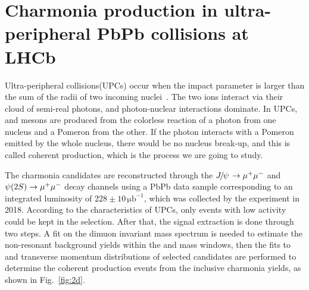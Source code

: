 \documentclass{appolb}
\begin{document}
\section{Charmonia production in ultra-peripheral PbPb collisions at LHCb~\cite{LHCb:2022ahs} }
Ultra-peripheral collisions(UPCs) occur when the impact parameter is larger than the sum of the radii of two incoming nuclei~\cite{Bertulani:2005ru}. 
The two ions interact via their cloud of semi-real photons, and photon-nuclear interactions dominate. 
In UPCs, \jpsi and \psitwos mesons are produced from the colorless reaction of a photon from one nucleus and a Pomeron from the other.
If the photon interacts with a Pomeron emitted by the whole nucleus, there would be no nucleus break-up, and this is called coherent production, which is the process we are going to study.

The charmonia candidates are reconstructed through the ${{J\mskip -3mu/\mskip -2mu\psi\mskip 2mu}}\rightarrow{\ensuremath{\mu^+\mu^-}}$ and ${\psi{(2S)}}\rightarrow{\ensuremath{\mu^+\mu^-}}$ decay channels using a PbPb data sample corresponding to an integrated luminosity of $228\pm10\,\mathrm{\mu b}^{-1}$, which was collected by the \lhcb experiment in 2018. 
According to the characteristics of UPCs, only events with low activity could be kept in the selection.
After that, 
the signal extraction is done through two steps.
A fit on the dimuon invariant mass spectrum is needed to estimate the non-resonant background yields within the \jpsi and \psitwos mass windows, then the fits to \jpsi and \psitwos transverse momentum distributions of selected candidates are performed to determine the coherent production events from the inclusive charmonia yields, as shown in Fig.~\ref{fig:2d}. 
\end{document}
